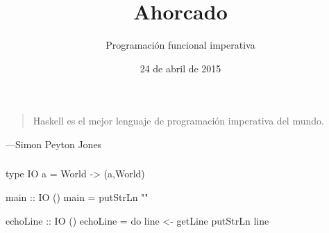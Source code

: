 \documentclass{beamer}
\title{Ahorcado}
\subtitle{Programación funcional imperativa}
\author{}
\institute{Stack Builders}
\date{24 de abril de 2015}
\begin{document}

\frame{\titlepage}


\begin{frame}
  \frametitle{}

  \begin{quote}
    Haskell es el mejor lenguaje de programación imperativa del mundo.
  \end{quote}
  \hfill---Simon Peyton Jones
\end{frame}


\begin{frame}[fragile]
  \frametitle{}

  \begin{code}
type IO a = World -> (a,World)
  \end{code}
\end{frame}


\begin{frame}[fragile]

  \begin{code}
main :: IO ()
main = putStrLn ""
  \end{code}
\end{frame}


\begin{frame}[fragile]

  \begin{code}
echoLine :: IO ()
echoLine = do
  line <- getLine
  putStrLn line
  \end{code}
\end{frame}

\end{document}
